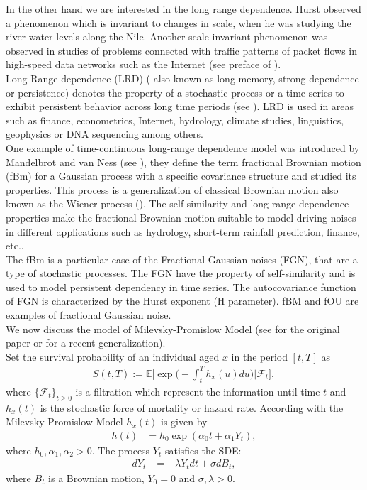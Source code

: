 \documentclass[smallextended]{svjour3}
\newcommand{\E}{\mathbb{E}}
\begin{document}
In the other hand we are interested in the long range dependence.
Hurst \cite{hu} observed a phenomenon which is invariant to changes in scale,
when
he was studying the river water levels along the Nile. Another scale-invariant
phenomenon was observed in studies of problems connected with traffic patterns
of packet
flows in high-speed data networks such as the Internet (see preface of
\cite{ra}).\\



Long Range dependence (LRD) ( also known as long memory, strong dependence or
persistence)
denotes the property of a stochastic process or a time series to exhibit
persistent behavior across long time periods
(see \cite{ra}). LRD is used in areas such as finance, econometrics,
Internet, hydrology, climate studies, linguistics, geophysics or DNA sequencing
among others. \\


One example of time-continuous long-range dependence model was introduced by
Mandelbrot and van Ness (see \cite{ma-va}), they define the term
fractional Brownian motion (fBm) for a Gaussian process with a specific
covariance
structure and studied its properties. This process is a generalization of
classical
Brownian motion also known as the Wiener process (\cite{ra}). The
self-similarity and
long-range dependence properties make the fractional Brownian motion
suitable to model driving noises in different applications such as hydrology,
short-term rainfall prediction, finance, etc.. \\

The fBm is a particular case of the Fractional Gaussian noises (FGN), that are
a type of stochastic
processes. The FGN have the property of self-similarity and is
used to model persistent dependency in time series.
The autocovariance function of FGN is characterized by the Hurst exponent (H
parameter).
fBM and fOU are examples of fractional Gaussian noise. \\


We now discuss the model of Milevsky-Promislow Model (see \cite{mi-pr} for the
original paper
or \cite{gi-or-be}
for a recent generalization). \\

Set the survival probability of an individual aged $x$ in the period $[t,T]$ as
\begin{align}\label{E-surv}
    S(t,T):=\E\Big[\exp\Big(-\int_t^T h_x(u) du\Big)\Big|\mathcal{F}_t \Big],
\end{align}
where $\{\mathcal{F}_t\}_{t\ge 0} $ is a filtration which represent the
information until time $t$ and $h_x(t)$ is the
stochastic force of mortality or hazard rate. According with the
Milevsky-Promislow Model $h_x(t)$ is given by
\begin{align}
h(t)&=h_0\exp(\alpha_0t+\alpha_1Y_t),\label{mod-1}
\end{align}
where  $h_0,\alpha_1,\alpha_2> 0$. The process $Y_t$ satisfies the SDE:
\begin{align}
dY_t&=-\lambda Y_tdt+\sigma dB_t, \label{mod-3}
\end{align}
where $B_t$ is a Brownian motion, $Y_0=0$ and $\sigma,\lambda> 0$.\\
\end{document}

